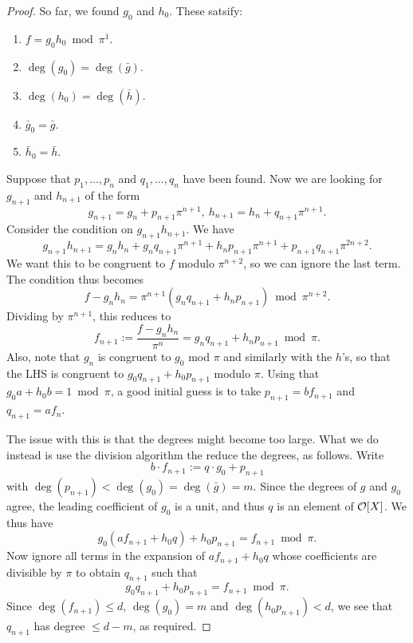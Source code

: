 \begin{proof}
  So far, we found $g_{0}$ and $h_{0}$.
  These satsify:
  \begin{enumerate}
    \item $f = g_{0} h_{0} \bmod \pi^{1}$.
    \item $\deg(g_{0}) = \deg(\bar g)$.
    \item $\deg(h_{0}) = \deg(\bar h)$.
    \item $\bar g_{0} = \bar g$.
    \item $\bar h_{0} = \bar h$.
  \end{enumerate}
  Suppose that $p_{1},\ldots,p_{n}$ and $q_{1},\ldots,q_{n}$ have been found.
  Now we are looking for $g_{n+1}$ and $h_{n+1}$ of the form
  \[ g_{n+1} = g_{n} + p_{n+1}\pi^{n+1}, \ h_{n+1} = h_{n} + q_{n+1} \pi^{n+1}. \]
  Consider the condition on $g_{n+1}h_{n+1}$.
  We have
  \[ g_{n+1} h_{n+1} = g_{n}h_{n} + g_{n} q_{n+1} \pi^{n+1} + h_{n} p_{n+1}\pi^{n+1} + p_{n+1}q_{n+1}\pi^{2n+2}. \]
  We want this to be congruent to $f$ modulo $\pi^{n+2}$, so we can ignore the last term.
  The condition thus becomes
  \[ f - g_{n} h_{n} = \pi^{n+1}(g_{n}q_{n+1}+h_{n}p_{n+1}) \bmod \pi^{n+2}. \]
  Dividing by $\pi^{n+1}$, this reduces to
  \[ f_{n+1} := \frac{f-g_{n}h_{n}}{\pi^{n}} = g_{n} q_{n+1} + h_{n} p_{n+1} \bmod \pi. \]
  Also, note that $g_{n}$ is congruent to $g_{0}$ mod $\pi$ and similarly with the $h$'s, so that the LHS is congruent to $g_{0} q_{n+1} + h_{0} p_{n+1}$ modulo $\pi$.
  Using that $g_{0}a + h_{0} b = 1 \bmod \pi$, a good initial guess is to take $p_{n+1} = b f_{n+1}$ and $q_{n+1} = a f_{n}$.

  The issue with this is that the degrees might become too large.
  What we do instead is use the division algorithm the reduce the degrees, as follows.
  Write
  \[ b \cdot f_{n+1} := q \cdot g_{0} + p_{n+1} \]
  with $\deg(p_{n+1}) < \deg(g_{0}) = \deg(\bar g) = m$.
  Since the degrees of $g$ and $g_{0}$ agree, the leading coefficient of $g_{0}$ is a unit, and thus $q$ is an element of $\mathcal{O}[X]$.
  We thus have
  \[ g_{0}(a f_{n+1} + h_{0}q) + h_{0} p_{n+1} = f_{n+1} \bmod \pi. \]
  Now ignore all terms in the expansion of $a f_{n+1} + h_{0} q$ whose coefficients are divisible by $\pi$ to obtain $q_{n+1}$ such that
  \[ g_{0} q_{n+1} + h_{0} p_{n+1} = f_{n+1} \bmod \pi. \]
  Since $\deg(f_{n+1}) \leq d$, $\deg(g_{0}) = m$ and $\deg(h_{0} p_{n+1}) < d$, we see that $q_{n+1}$ has degree $\leq d-m$, as required.
\end{proof}

